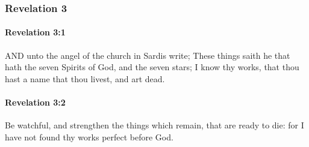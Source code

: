 	\subsubsection{Revelation 3} %
		\label{REVELATIONNT-3}
		
		\paragraph{Revelation 3:1} %
			\label{REVELATIONNT-3-1}

			AND unto the angel of the church in Sardis write; These things saith he that hath the seven Spirits of God, and the seven stars; I know thy works, that thou hast a name that thou livest, and art dead.

			\begin{framed}
			\scriptsize
				\begin{compactdesc}
					\item[SBLG] 
				\end{compactdesc}
			\end{framed}

		\paragraph{Revelation 3:2} %
			\label{REVELATIONNT-3-2}

			Be watchful, and strengthen the things which remain, that are ready to die: for I have not found thy works perfect before God.

